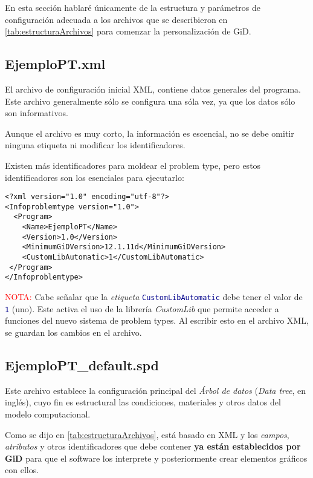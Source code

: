 \documentclass[10pt, a4paper, twocolumn]{article} %
\begin{document}
En esta sección hablaré únicamente de la estructura y parámetros de configuración adecuada a los archivos que se describieron en \ref{tab:estructuraArchivos} para comenzar la personalización de GiD.

\subsection{EjemploPT.xml}

El archivo de configuración inicial XML, contiene datos generales del programa. Este archivo generalmente sólo se configura una sóla vez, ya que los datos sólo son informativos.

Aunque el archivo es muy corto, la información es escencial, no se debe omitir ninguna etiqueta ni modificar los identificadores.

Existen más identificadores para moldear el problem type, pero estos identificadores son los esenciales para ejecutarlo:

\lstset{language=XML} 
\begin{lstlisting}
<?xml version="1.0" encoding="utf-8"?>
<Infoproblemtype version="1.0">
  <Program>
    <Name>EjemploPT</Name>
    <Version>1.0</Version>   
    <MinimumGiDVersion>12.1.11d</MinimumGiDVersion>
    <CustomLibAutomatic>1</CustomLibAutomatic>
 </Program>
</Infoproblemtype>
\end{lstlisting}

\textcolor{red}{NOTA:} Cabe señalar que la \textit{etiqueta} \texttt{\textcolor{darkblue}{CustomLibAutomatic}} debe tener el valor de \texttt{\textcolor{darkblue}{1}} (uno). Este activa el uso de la librería \textit{CustomLib} que permite acceder a funciones del nuevo sistema de problem types.
Al escribir esto en el archivo XML, se guardan los cambios en el archivo.

\subsection{EjemploPT\_default.spd}

Este archivo establece la configuración principal del \textit{Árbol de datos} (\textit{Data tree}, en inglés), cuyo fin es estructural las condiciones, materiales y otros datos del modelo computacional.

Como se dijo en \ref{tab:estructuraArchivos}, está basado en XML y los \textit{campos}, \textit{atributos} y otros identificadores que debe contener \textbf{ya están establecidos por GiD} para que el software los interprete y posteriormente crear elementos gráficos con ellos.
\end{document}
